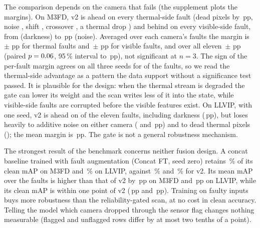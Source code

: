 The comparison depends on the camera that fails (the supplement plots the margins). On M3FD, v2 is ahead on every thermal-side fault (dead pixels by \fltMfdMarginThermalDeadSevThreeMeanMap{}\,pp, noise \fltMfdMarginThermalNoiseSevThreeMeanMap{}, shift \fltMfdMarginThermalShiftSevThreeMeanMap{}, crossover \fltMfdMarginThermalCrossoverSevThreeMeanMap{}, a thermal drop \fltMfdMarginThermalDropSevThreeMeanMap{}) and behind on every visible-side fault, from \fltMfdMarginVisibleDarkSevThreeMeanMap{} (darkness) to \fltMfdMarginVisibleNoiseSevThreeMeanMap{}\,pp (noise). Averaged over each camera's faults the margin is \fltMfdMarginMeanThermalAvgSevThreeMap{}\,$\pm$\,\fltMfdMarginStdThermalAvgSevThreeMap{}\,pp for thermal faults and \fltMfdMarginMeanVisibleAvgSevThreeMap{}\,$\pm$\,\fltMfdMarginStdVisibleAvgSevThreeMap{}\,pp for visible faults, and over all eleven \fltMfdMarginMeanAvgSevThreeMap{}\,$\pm$\,\fltMfdMarginStdAvgSevThreeMap{}\,pp (paired $p=0.06{}$, 95\,\% interval \fltMfdMarginAvgCiLow{} to \fltMfdMarginAvgCiHigh{}\,pp), not significant at $n=3$. The sign of the per-fault margin agrees on all three seeds for \fltMfdSignAgreeSevThree{} of the \fltMfdFaultCount{} faults, so we read the thermal-side advantage as a pattern the data support without a significance test passed. It is plausible for the design: when the thermal stream is degraded the gate can lower its weight and the scan writes less of it into the state, while visible-side faults are corrupted before the visible features exist. On LLVIP, with one seed, v2 is ahead on \fltLlvipWinsSevThree{} of the eleven faults, including darkness (\fltLlvipMarginVisibleDarkSevThreeMap{}\,pp), but loses heavily to additive noise on either camera (\fltLlvipMarginVisibleNoiseSevThreeMap{} and \fltLlvipMarginThermalNoiseSevThreeMap{}\,pp) and to dead thermal pixels (\fltLlvipMarginThermalDeadSevThreeMap{}); the mean margin is \fltLlvipMarginAvgSevThreeMap{}\,pp. The gate is not a general robustness mechanism.

The strongest result of the benchmark concerns neither fusion design. A concat baseline trained with fault augmentation (Concat FT, seed zero) retains \fltMfdConcatFtRetainedSevThreePercent{}\,\% of its clean mAP on M3FD and \fltLlvipConcatFtRetainedSevThreePercent{}\,\% on LLVIP, against \fltMfdCffmVtwoMeanRetainedSevThreePercent{}\,\% and \fltLlvipCffmVtwoRetainedSevThreePercent{}\,\% for v2. Its mean mAP over the faults is higher than that of v2 by \fltMfdVtwoVsConcatFtGapSevThreeMap{}\,pp on M3FD and \fltLlvipVtwoVsConcatFtGapSevThreeMap{}\,pp on LLVIP, while its clean mAP is within one point of v2 (\fltMfdVtwoVsConcatFtCleanMap{}\,pp and \fltLlvipVtwoVsConcatFtCleanMap{}\,pp). Training on faulty inputs buys more robustness than the reliability-gated scan, at no cost in clean accuracy. Telling the model which camera dropped through the sensor flag changes nothing measurable (flagged and unflagged rows differ by at most two tenths of a point).

